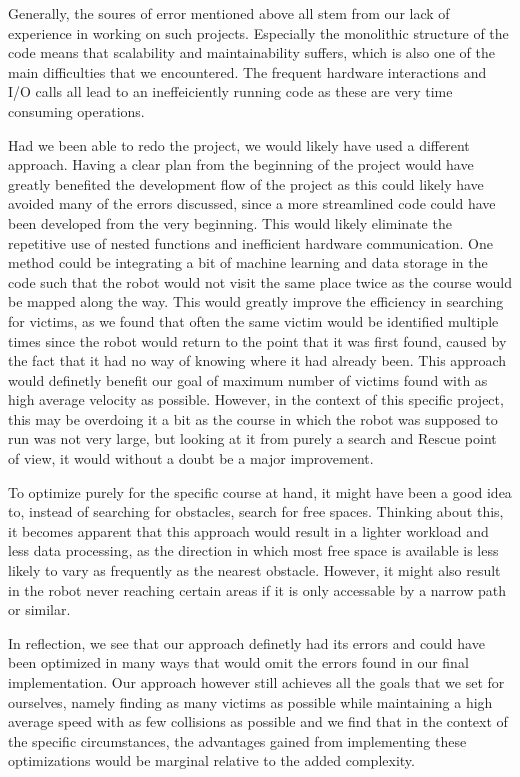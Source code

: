 \documentclass[conference]{IEEEtran}
\begin{document}
Generally, the soures of error mentioned above all stem from our lack of experience in working on such projects. Especially the monolithic structure of the code means that scalability and maintainability suffers, which is also one of the main difficulties that we encountered.
The frequent hardware interactions and I/O calls all lead to an ineffeiciently running code as these are very time consuming operations.

Had we been able to redo the project, we would likely have used a different approach.
Having a clear plan from the beginning of the project would have greatly benefited the development flow of the project as this could likely have avoided many of the errors discussed, since a more streamlined code could have been developed from the very beginning.
This would likely eliminate the repetitive use of nested functions and inefficient hardware communication.
One method could be integrating a bit of machine learning and data storage in the code such that the robot would not visit the same place twice as the course would be mapped along the way. This would greatly improve the efficiency in searching for victims, as we found that often the same victim would be identified multiple times since the robot would return to the point that it was first found, caused by the fact that it had no way of knowing where it had already been.
This approach would definetly benefit our goal of maximum  number of victims found with as high average velocity as possible.
However, in the context of this specific project, this may be overdoing it a bit as the course in which the robot was supposed to run was not very large, but looking at it from purely a search and Rescue point of view, it would without a doubt be a major improvement.

To optimize purely for the specific course at hand, it might have been a good idea to, instead of searching for obstacles, search for free spaces.
Thinking about this, it becomes apparent that this approach would result in a lighter workload and less data processing, as the direction in which most free space is available is less likely to vary as frequently as the nearest obstacle.
However, it might also result in the robot never reaching certain areas if it is only accessable by a narrow path or similar.

In reflection, we see that our approach definetly had its errors and could have been optimized in many ways that would omit the errors found in our final implementation.
Our approach however still achieves all the goals that we set for ourselves, namely finding as many victims as possible while maintaining a high average speed with as few collisions as possible and we find that in the context of the specific circumstances, the advantages gained from implementing these optimizations would be marginal relative to the added complexity.
\end{document}
